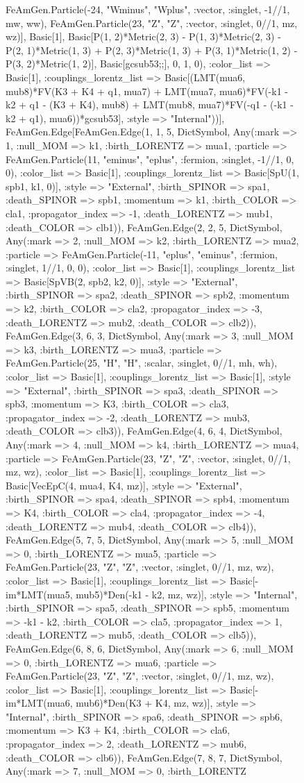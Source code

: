 \documentclass{revtex4}
\begin{document}
\begin{figure}[!htb]
\begin{center}
{FeAmGen.Particle(-24, "Wminus", "Wplus", :vector, :singlet, -1//1, mw, ww), FeAmGen.Particle(23, "Z", "Z", :vector, :singlet, 0//1, mz, wz)], Basic[1], Basic[P(1, 2)*Metric(2, 3) - P(1, 3)*Metric(2, 3) - P(2, 1)*Metric(1, 3) + P(2, 3)*Metric(1, 3) + P(3, 1)*Metric(1, 2) - P(3, 2)*Metric(1, 2)], Basic[gcsub53;;], 0, 1, 0), :color_list => Basic[1], :couplings_lorentz_list => Basic[(LMT(mua6, mub8)*FV(K3 + K4 + q1, mua7) + LMT(mua7, mua6)*FV(-k1 - k2 + q1 - (K3 + K4), mub8) + LMT(mub8, mua7)*FV(-q1 - (-k1 - k2 + q1), mua6))*gcsub53], :style => "Internal"))], FeAmGen.Edge[FeAmGen.Edge(1, 1, 5, Dict{Symbol, Any}(:mark => 1, :null_MOM => k1, :birth_LORENTZ => mua1, :particle => FeAmGen.Particle(11, "eminus", "eplus", :fermion, :singlet, -1//1, 0, 0), :color_list => Basic[1], :couplings_lorentz_list => Basic[SpU(1, spb1, k1, 0)], :style => "External", :birth_SPINOR => spa1, :death_SPINOR => spb1, :momentum => k1, :birth_COLOR => cla1, :propagator_index => -1, :death_LORENTZ => mub1, :death_COLOR => clb1)), FeAmGen.Edge(2, 2, 5, Dict{Symbol, Any}(:mark => 2, :null_MOM => k2, :birth_LORENTZ => mua2, :particle => FeAmGen.Particle(-11, "eplus", "eminus", :fermion, :singlet, 1//1, 0, 0), :color_list => Basic[1], :couplings_lorentz_list => Basic[SpVB(2, spb2, k2, 0)], :style => "External", :birth_SPINOR => spa2, :death_SPINOR => spb2, :momentum => k2, :birth_COLOR => cla2, :propagator_index => -3, :death_LORENTZ => mub2, :death_COLOR => clb2)), FeAmGen.Edge(3, 6, 3, Dict{Symbol, Any}(:mark => 3, :null_MOM => k3, :birth_LORENTZ => mua3, :particle => FeAmGen.Particle(25, "H", "H", :scalar, :singlet, 0//1, mh, wh), :color_list => Basic[1], :couplings_lorentz_list => Basic[1], :style => "External", :birth_SPINOR => spa3, :death_SPINOR => spb3, :momentum => K3, :birth_COLOR => cla3, :propagator_index => -2, :death_LORENTZ => mub3, :death_COLOR => clb3)), FeAmGen.Edge(4, 6, 4, Dict{Symbol, Any}(:mark => 4, :null_MOM => k4, :birth_LORENTZ => mua4, :particle => FeAmGen.Particle(23, "Z", "Z", :vector, :singlet, 0//1, mz, wz), :color_list => Basic[1], :couplings_lorentz_list => Basic[VecEpC(4, mua4, K4, mz)], :style => "External", :birth_SPINOR => spa4, :death_SPINOR => spb4, :momentum => K4, :birth_COLOR => cla4, :propagator_index => -4, :death_LORENTZ => mub4, :death_COLOR => clb4)), FeAmGen.Edge(5, 7, 5, Dict{Symbol, Any}(:mark => 5, :null_MOM => 0, :birth_LORENTZ => mua5, :particle => FeAmGen.Particle(23, "Z", "Z", :vector, :singlet, 0//1, mz, wz), :color_list => Basic[1], :couplings_lorentz_list => Basic[-im*LMT(mua5, mub5)*Den(-k1 - k2, mz, wz)], :style => "Internal", :birth_SPINOR => spa5, :death_SPINOR => spb5, :momentum => -k1 - k2, :birth_COLOR => cla5, :propagator_index => 1, :death_LORENTZ => mub5, :death_COLOR => clb5)), FeAmGen.Edge(6, 8, 6, Dict{Symbol, Any}(:mark => 6, :null_MOM => 0, :birth_LORENTZ => mua6, :particle => FeAmGen.Particle(23, "Z", "Z", :vector, :singlet, 0//1, mz, wz), :color_list => Basic[1], :couplings_lorentz_list => Basic[-im*LMT(mua6, mub6)*Den(K3 + K4, mz, wz)], :style => "Internal", :birth_SPINOR => spa6, :death_SPINOR => spb6, :momentum => K3 + K4, :birth_COLOR => cla6, :propagator_index => 2, :death_LORENTZ => mub6, :death_COLOR => clb6)), FeAmGen.Edge(7, 8, 7, Dict{Symbol, Any}(:mark => 7, :null_MOM => 0, :birth_LORENTZ }
\end{center}
\end{figure}
\end{document}
